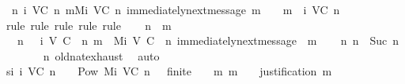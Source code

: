 \begin{isabellebody}
\ \ {\isachardoublequoteopen}{\isasymforall}n{\isasymge}{}{\isachardot}\ {\isasymforall}{\isasymsigma}{\isasymin}{\isasymSigma}{\isacharunderscore}i\ {\isacharparenleft}V{\isacharcomma}C{\isacharcomma}{\isasymepsilon}{\isacharparenright}\ n{\isachardot}\ {\isasymforall}m{\isasymin}M{\isacharunderscore}i\ {\isacharparenleft}V{\isacharcomma}C{\isacharcomma}{\isasymepsilon}{\isacharparenright}\ n{\isachardot}\ immediately{\isacharunderscore}next{\isacharunderscore}message\ {\isacharparenleft}{\isasymsigma}{\isacharcomma}m{\isacharparenright}\ {\isasymlongrightarrow}\ {\isasymsigma}\ {\isasymunion}\ {\isacharbraceleft}m{\isacharbraceright}\ {\isasymin}\ {\isasymSigma}{\isacharunderscore}i\ {\isacharparenleft}V{\isacharcomma}C{\isacharcomma}{\isasymepsilon}{\isacharparenright}\ {\isacharparenleft}n{\isacharplus}{}{\isacharparenright}{\isachardoublequoteclose}\isanewline
%
\isadelimproof
\ \ %
\endisadelimproof
%
\isatagproof
{}\isamarkupfalse%
\ {\isacharparenleft}rule{\isacharcomma}\ rule{\isacharcomma}\ rule{\isacharcomma}\ rule{\isacharcomma}\ rule{\isacharparenright}\isanewline
{}\isamarkupfalse%
{\isacharminus}\isanewline
\ \ \isamarkupfalse%
\ n\ {\isasymsigma}\ m\isanewline
\ \ \isamarkupfalse%
\ {\isachardoublequoteopen}{}\ {\isasymle}\ n{\isachardoublequoteclose}\ {\isachardoublequoteopen}{\isasymsigma}\ {\isasymin}\ {\isasymSigma}{\isacharunderscore}i\ {\isacharparenleft}V{\isacharcomma}\ C{\isacharcomma}\ {\isasymepsilon}{\isacharparenright}\ n{\isachardoublequoteclose}\ {\isachardoublequoteopen}m\ {\isasymin}\ M{\isacharunderscore}i\ {\isacharparenleft}V{\isacharcomma}\ C{\isacharcomma}\ {\isasymepsilon}{\isacharparenright}\ n{\isachardoublequoteclose}\ {\isachardoublequoteopen}immediately{\isacharunderscore}next{\isacharunderscore}message\ {\isacharparenleft}{\isasymsigma}{\isacharcomma}\ m{\isacharparenright}{\isachardoublequoteclose}\isanewline
\isanewline
\ \ \isamarkupfalse%
\ {\isachardoublequoteopen}{\isasymexists}n{\isacharprime}{\isachardot}\ n\ {\isacharequal}\ Suc\ n{\isacharprime}{\isachardoublequoteclose}\isanewline
\ \ \ \ \isamarkupfalse%
\ {\isacartoucheopen}{}\ {\isasymle}\ n{\isacartoucheclose}\ old{\isachardot}nat{\isachardot}exhaust\ \isamarkupfalse%
\ auto\isanewline
\ \ \isamarkupfalse%
\ si{\isacharcolon}\ {\isachardoublequoteopen}{\isasymSigma}{\isacharunderscore}i\ {\isacharparenleft}V{\isacharcomma}C{\isacharcomma}{\isasymepsilon}{\isacharparenright}\ n\ {\isacharequal}\ {\isacharbraceleft}{\isasymsigma}\ {\isasymin}\ Pow\ {\isacharparenleft}M{\isacharunderscore}i\ {\isacharparenleft}V{\isacharcomma}C{\isacharcomma}{\isasymepsilon}{\isacharparenright}\ {\isacharparenleft}n\ {\isacharminus}\ {}{\isacharparenright}{\isacharparenright}{\isachardot}\ finite\ {\isasymsigma}\ {\isasymand}\ {\isacharparenleft}{\isasymforall}\ m{\isachardot}\ m\ {\isasymin}\ {\isasymsigma}\ {\isasymlongrightarrow}\ justification\ m\ {\isasymsubseteq}\ {\isasymsigma}{\isacharparenright}{\isacharbraceright}{\isachardoublequoteclose}\isanewline

\end{isabellebody}
